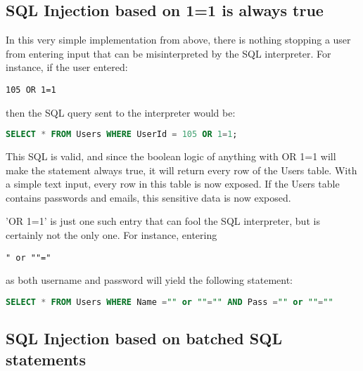 \subsection{SQL Injection based on 1=1 is always true}

In this very simple implementation from above, there is nothing stopping a user from entering input that can be misinterpreted by the SQL interpreter. For instance, if the user entered:
\begin{verbatim}
105 OR 1=1
\end{verbatim}
then the SQL query sent to the interpreter would be:
\begin{lstlisting}[language = SQL]
SELECT * FROM Users WHERE UserId = 105 OR 1=1;
\end{lstlisting}
This SQL is valid, and since the boolean logic of anything with OR 1=1 will make the statement always true, it will return every row of the Users table. With a simple text input, every row in this table is now exposed. If the Users table contains passwords and emails, this sensitive data is now exposed.

'OR 1=1' is just one such entry that can fool the SQL interpreter, but is certainly not the only one. For instance, entering
\begin{verbatim}
" or ""="
\end{verbatim}
as both username and password will yield the following statement:
\begin{lstlisting}[language = SQL]
SELECT * FROM Users WHERE Name ="" or ""="" AND Pass ="" or ""=""
\end{lstlisting}

\subsection{SQL Injection based on batched SQL statements}

